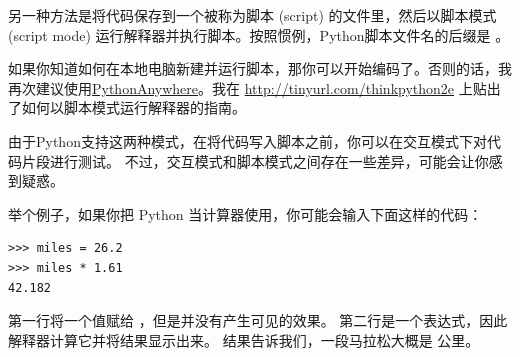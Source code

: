 
另一种方法是将代码保存到一个被称为脚本 (script) 的文件里，然后以脚本模式 (script mode) 运行解释器并执行脚本。按照惯例，Python脚本文件名的后缀是 。
  
  


如果你知道如何在本地电脑新建并运行脚本，那你可以开始编码了。否则的话，我再次建议使用\hyperref[python_anywhere]{PythonAnywhere}。我在 \href{http://tinyurl.com/thinkpython2e}{http://tinyurl.com/thinkpython2e} 上贴出了如何以脚本模式运行解释器的指南。


由于Python支持这两种模式，在将代码写入脚本之前，你可以在交互模式下对代码片段进行测试。  
不过，交互模式和脚本模式之间存在一些差异，可能会让你感到疑惑。

  
  


举个例子，如果你把 Python 当计算器使用，你可能会输入下面这样的代码：

\begin{lstlisting}
>>> miles = 26.2
>>> miles * 1.61
42.182
\end{lstlisting}


第一行将一个值赋给 ，但是并没有产生可见的效果。 第二行是一个表达式，因此解释器计算它并将结果显示出来。 结果告诉我们，一段马拉松大概是  公里。

